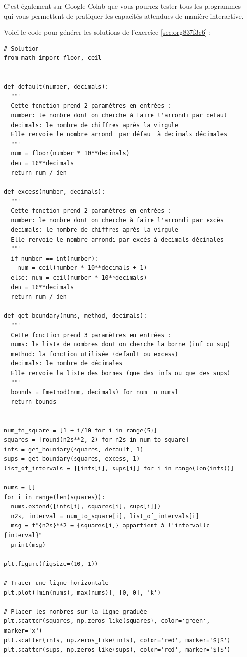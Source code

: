 \documentclass[a4paper, 11pt, twoside]{book}
\begin{document}
C'est également sur Google Colab que vous pourrez tester tous les
programmes qui vous permettent de pratiquer les capacités attendues
de manière interactive.

Voici le code pour générer les solutions de l'exercice \ref{sec:org837f3c6} :
\begin{verbatim}
# Solution
from math import floor, ceil


def default(number, decimals):
  """
  Cette fonction prend 2 paramètres en entrées :
  number: le nombre dont on cherche à faire l'arrondi par défaut
  decimals: le nombre de chiffres après la virgule
  Elle renvoie le nombre arrondi par défaut à decimals décimales
  """
  num = floor(number * 10**decimals)
  den = 10**decimals
  return num / den

def excess(number, decimals):
  """
  Cette fonction prend 2 paramètres en entrées :
  number: le nombre dont on cherche à faire l'arrondi par excès
  decimals: le nombre de chiffres après la virgule
  Elle renvoie le nombre arrondi par excès à decimals décimales
  """
  if number == int(number):
    num = ceil(number * 10**decimals + 1)
  else: num = ceil(number * 10**decimals)
  den = 10**decimals
  return num / den

def get_boundary(nums, method, decimals):
  """
  Cette fonction prend 3 paramètres en entrées :
  nums: la liste de nombres dont on cherche la borne (inf ou sup)
  method: la fonction utilisée (default ou excess)
  decimals: le nombre de décimales
  Elle renvoie la liste des bornes (que des infs ou que des sups)
  """
  bounds = [method(num, decimals) for num in nums]
  return bounds


num_to_square = [1 + i/10 for i in range(5)]
squares = [round(n2s**2, 2) for n2s in num_to_square]
infs = get_boundary(squares, default, 1)
sups = get_boundary(squares, excess, 1)
list_of_intervals = [[infs[i], sups[i]] for i in range(len(infs))]

nums = []
for i in range(len(squares)):
  nums.extend([infs[i], squares[i], sups[i]])
  n2s, interval = num_to_square[i], list_of_intervals[i]
  msg = f"{n2s}**2 = {squares[i]} appartient à l'intervalle {interval}"
  print(msg)

plt.figure(figsize=(10, 1))

# Tracer une ligne horizontale
plt.plot([min(nums), max(nums)], [0, 0], 'k')

# Placer les nombres sur la ligne graduée
plt.scatter(squares, np.zeros_like(squares), color='green', marker='x')
plt.scatter(infs, np.zeros_like(infs), color='red', marker='$[$')
plt.scatter(sups, np.zeros_like(sups), color='red', marker='$]$')


\end{verbatim}
\end{document}
